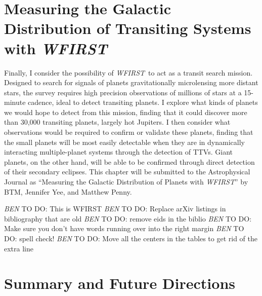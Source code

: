\documentclass[12pt]{caltech_thesis}
\newcommand{\todo}[3]{{\color{#2} \emph{#1} TO DO: #3}}
\newcommand{\btmtodo}[1]{\todo{BEN}{red}{#1}}
\newcommand{\WF}{{\textit {WFIRST}}}
\begin{document}


\chapter{Measuring the Galactic Distribution of Transiting Systems with \WF}
\label{chap:wfirst}
Finally, I consider the possibility of \WF\ to act as a transit search mission.
Designed to search for signals of planets gravitationally microlensing more distant stars, the survey
requires high precision observations of millions of stars at a 15-minute cadence, ideal to detect
transiting planets.
I explore what kinds of planets we would hope to detect from this mission, finding that it could discover more than 30,000
transiting planets, largely hot Jupiters.
I then consider what observations would be required to confirm or validate these planets, finding that the small planets
will be most easily detectable when they are in dynamically interacting multiple-planet systems through the detection of
TTVs.
Giant planets, on the other hand, will be able to be confirmed through direct detection of their secondary eclipses.
This chapter will be submitted to the Astrophysical Journal as ``Measuring the Galactic Distribution of Planets with \WF'' by
BTM, Jennifer Yee, and Matthew Penny.





\btmtodo{This is WFIRST}
\btmtodo{Replace arXiv listings in bibliography that are old}
\btmtodo{remove eids in the biblio}
\btmtodo{Make sure you don't have words running over into the right margin}
\btmtodo{spell check!}
\btmtodo{Move all the centers in the tables to get rid of the extra line}


\chapter{Summary and Future Directions}
\label{chap:summary}





\printbibliography[]
%





\end{document}

